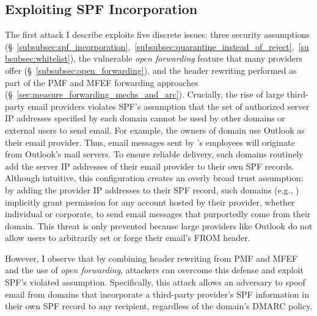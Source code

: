 \subsection{Exploiting SPF Incorporation}
\label{subsec:attack_open_forwarding}

The first attack I describe exploits five discrete issues:
three security assumptions (\S~\ref{subsubsec:spf_incorporation},~\ref{subsubsec:quarantine_instead_of_reject},~\ref{subsubsec:whitelist}),
the vulnerable \emph{open forwarding} feature that many providers offer (\S~\ref{subsubsec:open_forwarding}),
and the header rewriting performed as part of the PMF and MFEF forwarding approaches (\S~\ref{sec:measure_forwarding_mechs_and_arc}).
Crucially,
the rise of large third-party email providers violates SPF's assumption that the set of authorized server IP addresses specified by each domain cannot be used by other domains or external users to send email.
For example, the owners of domain  use Outlook as their email provider.  Thus, email messages sent by 's employees will originate from Outlook's mail servers.
To ensure reliable delivery, such domains routinely add the server IP addresses of their email provider to their own SPF records.
Although intuitive, this configuration creates an overly broad trust assumption: by adding the provider IP addresses to their SPF record, such domains (e.g., ) implicitly grant permission for any account hosted by their provider, whether individual or corporate, to send email messages that purportedly come from their domain.
This threat is only prevented because large providers like Outlook do not allow users to arbitrarily set or forge their email's FROM header.

However, I observe that by combining header rewriting from PMF and MFEF and the use of \emph{open forwarding}, attackers can overcome this defense and exploit SPF's violated assumption.
Specifically, this attack allows an adversary to spoof email from domains that incorporate a third-party provider's SPF information in their own SPF record to any recipient, regardless of the domain's DMARC policy.

